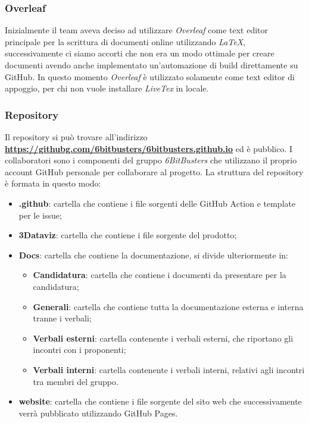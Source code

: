         \subsubsection{Overleaf}
        Inizialmente il team aveva deciso ad utilizzare \textit{Overleaf} come text editor principale per la scrittura di documenti online utilizzando \textit{LaTeX}, successivamente ci siamo accorti
        che non era un modo ottimale per creare documenti avendo anche implementato un'automazione di build direttamente su GitHub.
        In questo momento \textit{Overleaf} è utilizzato solamente come text editor di appoggio, per chi non vuole installare \textit{LiveTex} in locale.
        
        
        \subsubsection{Repository}
        Il repository si può trovare all'indirizzo \textbf{\url{https://githubg.com/6bitbusters/6bitbusters.github.io}} ed è pubblico.
        I collaboratori sono i componenti del gruppo \textit{6BitBusters} che utilizzano il proprio account GitHub
        personale per collaborare al progetto.
        La struttura del repository è formata in questo modo:
            \begin{itemize}
                \item \textbf{ .github}: cartella che contiene i file sorgenti delle GitHub Action e template per le issue;
                \item \textbf{3Dataviz}: cartella che contiene i file sorgente del prodotto;
                \item \textbf{Docs}: cartella che contiene la documentazione, si divide ulteriormente in:
                    \begin{itemize}
                        \item \textbf{Candidatura}: cartella che contiene i documenti da presentare per la candidatura;
                        \item \textbf{Generali}: cartella che contiene tutta la documentazione esterna e interna tranne i verbali;
                        \item \textbf{Verbali esterni}: cartella contenente i verbali esterni, che riportano gli incontri con i proponenti;
                        \item \textbf{Verbali interni}: cartella contenente i verbali interni, relativi agli incontri tra membri del gruppo.
                    \end{itemize}
                \item \textbf{website}: cartella che contiene i file sorgente del sito web che successivamente verrà pubblicato utilizzando GitHub Pages.
            \end{itemize}
